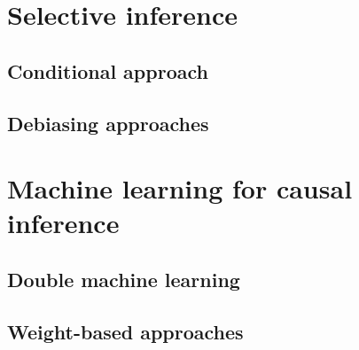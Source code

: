 \documentclass[]{book}
\theoremstyle{definition}
\theoremstyle{definition}
\theoremstyle{definition}
\theoremstyle{remark}
\begin{document}
\chapter{Selective inference}\label{selective-inference-1}

\section{Conditional approach}\label{conditional-approach}

\section{Debiasing approaches}\label{debiasing-approaches}

\chapter{Machine learning for causal
inference}\label{machine-learning-for-causal-inference}

\section{Double machine learning}\label{double-machine-learning}

\section{Weight-based approaches}\label{weight-based-approaches}


\end{document}
